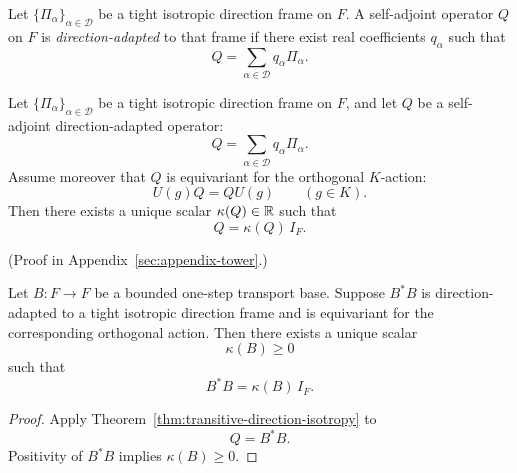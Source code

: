 \begin{definition}
\label{def:direction-adapted-quadratic-transport}
Let $\{\Pi_{\alpha}\}_{\alpha\in\mathcal D}$ be a tight isotropic direction
frame on $F$. A self-adjoint operator $Q$ on $F$ is
\emph{direction-adapted} to that frame if there exist real coefficients
$q_{\alpha}$ such that
\[
Q=\sum_{\alpha\in\mathcal D} q_{\alpha}\Pi_{\alpha}.
\]
\end{definition}

\begin{theorem}
\label{thm:transitive-direction-isotropy}
Let $\{\Pi_{\alpha}\}_{\alpha\in\mathcal D}$ be a tight isotropic direction
frame on $F$, and let $Q$ be a self-adjoint direction-adapted operator:
\[
Q=\sum_{\alpha\in\mathcal D} q_{\alpha}\Pi_{\alpha}.
\]
Assume moreover that $Q$ is equivariant for the orthogonal $K$-action:
\[
U(g)Q=QU(g)
\qquad(g\in K).
\]
Then there exists a unique scalar $\kappa(Q)\in\mathbb{R}$ such that
\[
Q=\kappa(Q)\,I_F.
\]
\end{theorem}

(Proof in Appendix~\ref{sec:appendix-tower}.)

\begin{corollary}
\label{cor:direction-frame-quadratic-coefficient}
Let $B:F\to F$ be a bounded one-step transport base. Suppose $B^*B$ is
direction-adapted to a tight isotropic direction frame and is equivariant for
the corresponding orthogonal action. Then there exists a unique scalar
\[
\kappa(B)\ge 0
\]
such that
\[
B^*B=\kappa(B)\,I_F.
\]
\end{corollary}

\begin{proof}
Apply Theorem~\ref{thm:transitive-direction-isotropy} to
\[
Q=B^*B.
\]
Positivity of $B^*B$ implies $\kappa(B)\ge 0$.
\end{proof}

